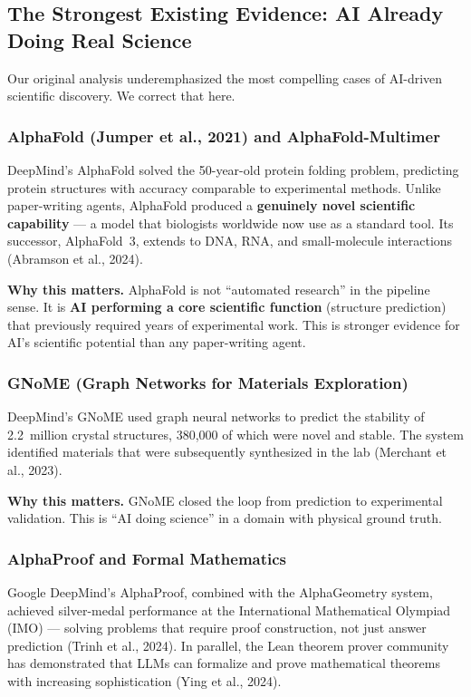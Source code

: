 \documentclass[11pt,a4paper]{article}
\begin{document}
\subsection{The Strongest Existing Evidence: AI Already Doing Real Science}

Our original analysis underemphasized the most compelling cases of AI-driven scientific discovery. We correct that here.

\subsubsection{AlphaFold (Jumper et al., 2021) and AlphaFold-Multimer}

DeepMind's AlphaFold solved the 50-year-old protein folding problem, predicting protein structures with accuracy comparable to experimental methods. Unlike paper-writing agents, AlphaFold produced a \textbf{genuinely novel scientific capability} --- a model that biologists worldwide now use as a standard tool. Its successor, AlphaFold~3, extends to DNA, RNA, and small-molecule interactions (Abramson et al., 2024).

\textbf{Why this matters.} AlphaFold is not ``automated research'' in the pipeline sense. It is \textbf{AI performing a core scientific function} (structure prediction) that previously required years of experimental work. This is stronger evidence for AI's scientific potential than any paper-writing agent.

\subsubsection{GNoME (Graph Networks for Materials Exploration)}

DeepMind's GNoME used graph neural networks to predict the stability of 2.2~million crystal structures, 380,000 of which were novel and stable. The system identified materials that were subsequently synthesized in the lab (Merchant et al., 2023).

\textbf{Why this matters.} GNoME closed the loop from prediction to experimental validation. This is ``AI doing science'' in a domain with physical ground truth.

\subsubsection{AlphaProof and Formal Mathematics}

Google DeepMind's AlphaProof, combined with the AlphaGeometry system, achieved silver-medal performance at the International Mathematical Olympiad (IMO) --- solving problems that require proof construction, not just answer prediction (Trinh et al., 2024). In parallel, the Lean theorem prover community has demonstrated that LLMs can formalize and prove mathematical theorems with increasing sophistication (Ying et al., 2024).
\end{document}
